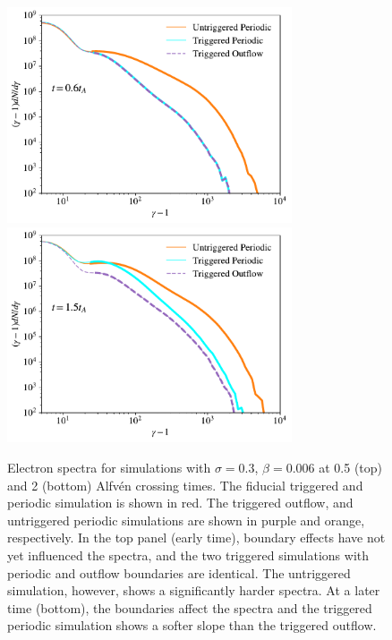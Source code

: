 \begin{figure}[!h]
	\centering
	\includegraphics[width =0.75\textwidth]{sig_3_delgam001_outflow_untriggered_earlytime.pdf}
	\includegraphics[width =0.75\textwidth]{sig_3_delgam001_outflow_untriggered_latetime.pdf}
	\caption{Electron spectra for simulations with $\sigma=0.3$, $\beta=0.006$ at 0.5 (top) and 2 (bottom) Alfv\'en crossing times.  The fiducial triggered and periodic simulation is shown in red.  The triggered outflow, and untriggered periodic simulations are shown in purple and orange, respectively.  In the top panel (early time), boundary effects have not yet influenced the spectra, and the two triggered simulations with periodic and outflow boundaries are identical.  The untriggered simulation, however, shows a significantly harder spectra.  At a later time (bottom), the boundaries affect the spectra and the triggered periodic simulation shows a softer slope than the triggered outflow.}
	\label{sigpoint3_outflow_early}
\end{figure}
